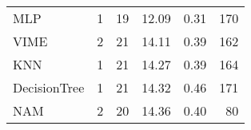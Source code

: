 \begin{tabular}{lrrrrr}
MLP                &                  1 &  19 &  12.09 &                           0.31 &   170 \\
VIME               &                  2 &  21 &  14.11 &                           0.39 &   162 \\
KNN                &                  1 &  21 &  14.27 &                           0.39 &   164 \\
DecisionTree       &                  1 &  21 &  14.32 &                           0.46 &   171 \\
NAM                &                  2 &  20 &  14.36 &                           0.40 &    80 \\
\bottomrule
\end{tabular}
